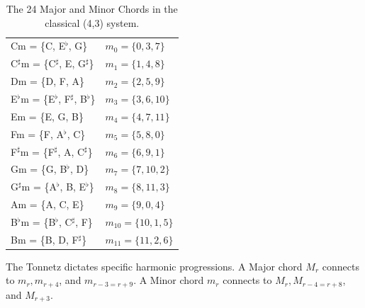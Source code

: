 \documentclass[11pt,letterpaper]{amsart}
\begin{document}
{\begin{table}[H]
\begin{minipage}{0.48\textwidth}
\begin{tabular}{ll}
        \midrule
        Cm = \{C, E$^\flat$, G\} & $m_0 = \{0, 3, 7\}$ \\
        C$^\sharp$m = \{C$^\sharp$, E, G$^\sharp$\} & $m_1 = \{1, 4, 8\}$ \\
        Dm = \{D, F, A\} & $m_2 = \{2, 5, 9\}$ \\
        E$^\flat$m = \{E$^\flat$, F$^\sharp$, B$^\flat$\} & $m_3 = \{3, 6, 10\}$ \\
        Em = \{E, G, B\} & $m_4 = \{4, 7, 11\}$ \\
        Fm = \{F, A$^\flat$, C\} & $m_5 = \{5, 8, 0\}$ \\
        F$^\sharp$m = \{F$^\sharp$, A, C$^\sharp$\} & $m_6 = \{6, 9, 1\}$ \\
        Gm = \{G, B$^\flat$, D\} & $m_7 = \{7, 10, 2\}$ \\
        G$^\sharp$m = \{A$^\flat$, B, E$^\flat$\} & $m_8 = \{8, 11, 3\}$ \\
        Am = \{A, C, E\} & $m_9 = \{9, 0, 4\}$ \\
        B$^\flat$m = \{B$^\flat$, C$^\sharp$, F\} & $m_{10} = \{10, 1, 5\}$ \\
        Bm = \{B, D, F$^\sharp$\} & $m_{11} = \{11, 2, 6\}$ \\
        \bottomrule
        \end{tabular}
    \end{minipage}
    \caption{The 24 Major and Minor Chords in the classical (4,3) system.}
\end{table}}

The Tonnetz dictates specific harmonic progressions. A Major chord $M_r$ connects to $m_r, m_{r+4}$, and $m_{r-3=r+9}$. A Minor chord $m_r$ connects to $M_r, M_{r-4=r+8}$, and $M_{r+3}$. 
\end{document}
